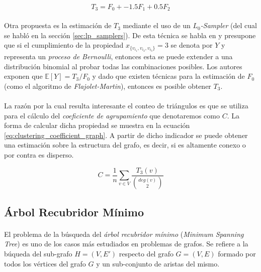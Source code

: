 \documentclass{subfiles}
\begin{document}
        \begin{equation}
        \label{eq:graph_triangles_frecuency}
          T_3 = F_0 + -1.5F_1 + 0.5 F_2
        \end{equation}

        \paragraph{}
        Otra propuesta es la estimación de $T_3$ mediante el uso de un \emph{$L_0$-Sampler} (del cual se habló en la sección \ref{sec:lp_samplers}). De esta técnica se habla en \cite{ahn2012graph} y presupone que si el cumplimiento de la propiedad $x_{\{v_{i_1},v_{i_2},v_{i_3}\}} = 3$ se denota por $Y$ y representa un \emph{proceso de Bernoulli}, entonces esta se puede extender a una distribución binomial al probar todas las combinaciones posibles. Los autores exponen que $\mathbb{E}[Y] = T_3/F_0$ y dado que existen técnicas para la estimación de $F_0$ (como el algoritmo de \emph{Flajolet-Martin}), entonces es posible obtener $T_3$.

        \paragraph{}
        La razón por la cual resulta interesante el conteo de triángulos es que se utiliza para el cálculo del \emph{coeficiente de agrupamiento} que denotaremos como $C$. La forma de calcular dicha propiedad se muestra en la ecuación \eqref{eq:clustering_coefficient_graph}. A partir de dicho indicador se puede obtener una estimación sobre la estructura del grafo, es decir, si es altamente conexo o por contra es disperso.

        \begin{equation}
        \label{eq:clustering_coefficient_graph}
          C = \frac{1}{n} \sum_{v\in V} \frac{T_3(v)}{\binom{deg(v)}{2}}
        \end{equation}



      \subsection{Árbol Recubridor Mínimo}
      \label{sec:minimum_spanning_tree}

        \paragraph{}
        El problema de la búsqueda del \emph{árbol recubridor mínimo} (\emph{Minimum Spanning Tree}) es uno de los casos más estudiados en problemas de grafos. Se refiere a la búqueda del sub-grafo $H = (V, E')$ respecto del grafo $G=(V, E)$ formado por todos los vértices del grafo $G$ y un sub-conjunto de aristas del mismo.
\end{document}
